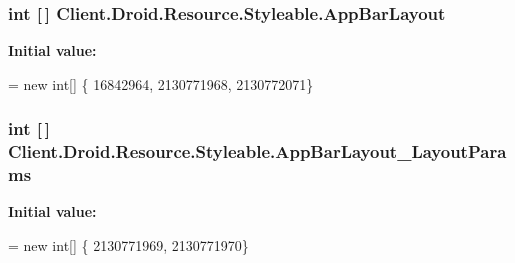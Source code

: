 \subsubsection[{App\+Bar\+Layout}]{\setlength{\rightskip}{0pt plus 5cm}int \mbox{[}$\,$\mbox{]} Client.\+Droid.\+Resource.\+Styleable.\+App\+Bar\+Layout\hspace{0.3cm}{\ttfamily [static]}}\label{classClient_1_1Droid_1_1Resource_1_1Styleable_ad6d7332f96413093171c7cad3eca2387}
{\bfseries Initial value\+:}
\begin{DoxyCode}
= \textcolor{keyword}{new} \textcolor{keywordtype}{int}[]
            \{
                    16842964,
                    2130771968,
                    2130772071\}
\end{DoxyCode}
\hypertarget{classClient_1_1Droid_1_1Resource_1_1Styleable_a7c9edda7bc85bbc005a321d00909e3d3}{}
\subsubsection[{App\+Bar\+Layout\+\_\+\+Layout\+Params}]{\setlength{\rightskip}{0pt plus 5cm}int \mbox{[}$\,$\mbox{]} Client.\+Droid.\+Resource.\+Styleable.\+App\+Bar\+Layout\+\_\+\+Layout\+Params\hspace{0.3cm}{\ttfamily [static]}}\label{classClient_1_1Droid_1_1Resource_1_1Styleable_a7c9edda7bc85bbc005a321d00909e3d3}
{\bfseries Initial value\+:}
\begin{DoxyCode}
= \textcolor{keyword}{new} \textcolor{keywordtype}{int}[]
            \{
                    2130771969,
                    2130771970\}
\end{DoxyCode}
\hypertarget{classClient_1_1Droid_1_1Resource_1_1Styleable_a76266a6a3df3be25af14e6a5a770655c}{}

